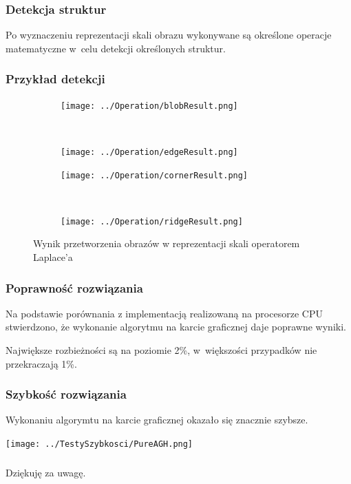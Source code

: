 \begin{frame}
\frametitle{Detekcja struktur}

Po wyznaczeniu reprezentacji skali obrazu wykonywane są określone operacje matematyczne w~celu detekcji określonych struktur.


\end{frame}
\begin{frame}
\frametitle{Przykład detekcji}

\begin{figure}[h]
\begin{center}
\begin{subfigure}[b]{2cm}
\centering
\texttt{[image: ../Operation/blobResult.png]}
\end{subfigure}~
\begin{subfigure}[b]{2cm}
\centering
\texttt{[image: ../Operation/edgeResult.png]}
\end{subfigure}

\begin{subfigure}[b]{2cm}
\centering
\texttt{[image: ../Operation/cornerResult.png]}
\end{subfigure}~
\begin{subfigure}[b]{2cm}
\centering
\texttt{[image: ../Operation/ridgeResult.png]}
\end{subfigure}
\caption{Wynik przetworzenia obrazów w reprezentacji skali operatorem Laplace'a}
\label{fig:wynik}
\end{center}
\end{figure}

\end{frame}
\begin{frame}
\frametitle{Poprawność rozwiązania}

Na podstawie porównania z implementacją realizowaną na procesorze CPU stwierdzono, że wykonanie algorytmu na karcie graficznej daje poprawne wyniki.

Największe rozbieżności są na poziomie 2\%, w~większości przypadków nie przekraczają 1\%.


\end{frame}
\begin{frame}
\frametitle{Szybkość rozwiązania}

Wykonaniu algorymtu na karcie graficznej okazało się znacznie szybsze.
\begin{center}
\texttt{[image: ../TestySzybkosci/PureAGH.png]}

\end{center}



\end{frame}

\begin{frame}
\frametitle{}
\begin{center}
Dziękuję za uwagę.
\end{center}
\end{frame}
